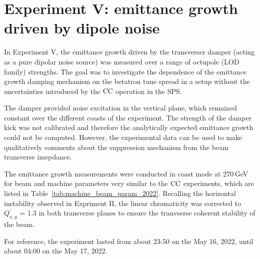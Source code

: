 \section{Experiment V: emittance growth driven by dipole noise}\label{sec:exp5_coast_md_damper_2022}

In Experiment V, the emittance growth driven by the transverser damper (acting as a pure dipolar noise source) was measured over a range of octupole (LOD family) strengths. The goal was to investigate the dependence of the emittance growth damping mechanism on the betatron tune spread in a setup without the uncertainties introduced by the ${\mathrm{CC}}$ operation in the SPS. %


The damper provided noise excitation in the vertical plane, which remained constant over the different coasts of the experiment. The strength of the damper kick was not calibrated and therefore the analytically expected emittance growth could not be computed. However, the experimental data can be used to make qualitatively comments about the suppression mechanism from the beam transverse imepdance.  

The emittance growth measurements were conducted in coast mode at 270\,GeV for beam and machine parameters very similar to the ${\mathrm{CC}}$ experiments, which are listed in Table~\ref{tab:machine_beam_param_2022}. Recalling the horizontal instability observed in Expriment II, the linear chromaticity was corrected to $Q^\prime_{x,y}$ = 1.3 in both transverse planes to ensure the tranvserse coherent stability of the beam.


For reference, the experiment lasted from about 23:50 on the May 16, 2022, until about 04:00 on the May 17, 2022.

